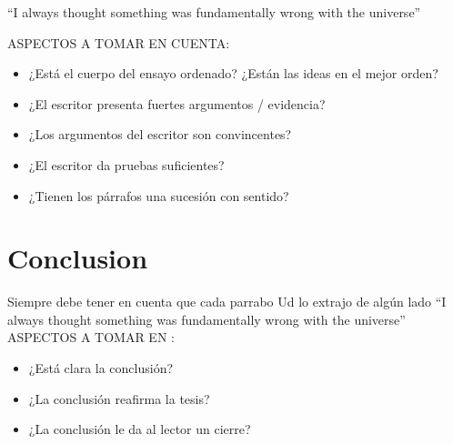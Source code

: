\documentclass{article}
\begin{document}
``I always thought something was fundamentally wrong with the universe'' \citep{adams1995hitchhiker}

ASPECTOS A TOMAR EN CUENTA:

\begin{itemize}
    \item  ¿Está el cuerpo del ensayo ordenado? ¿Están las ideas en el mejor orden?
    \item ¿El escritor presenta fuertes argumentos / evidencia?
    \item ¿Los argumentos del escritor son convincentes?
    \item ¿El escritor da pruebas suficientes?
    \item ¿Tienen los párrafos una sucesión con sentido?
\end{itemize}
\section{Conclusion}
Siempre debe tener en cuenta que cada parrabo Ud lo extrajo de algún lado ``I always thought something was fundamentally wrong with the universe'' \citep{adams1995hitchhiker}
ASPECTOS A TOMAR EN :
\begin{itemize}
    \item ¿Está clara la conclusión?
    \item ¿La conclusión reafirma la tesis?
    \item ¿La conclusión le da al lector un cierre?
\end{itemize}



\end{document}
